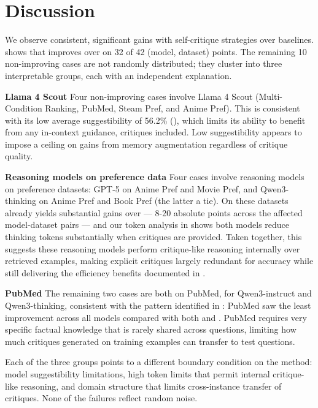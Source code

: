 \section{Discussion}

We observe consistent, significant gains  with self-critique strategies over baselines.
 shows that \EPSEMCRIT{} improves over \EPLABEL{} on 32 of 42 (model, dataset) points. The remaining 10 non-improving cases are not randomly distributed; they cluster into three interpretable groups, each with an independent explanation.

\textbf{Llama 4 Scout} Four non-improving cases involve Llama 4 Scout (Multi-Condition Ranking, PubMed, Steam Pref, and Anime Pref). This is consistent with its low average suggestibility of 56.2\% (), which limits its ability to benefit from any in-context guidance, critiques included. Low suggestibility appears to impose a ceiling on gains from memory augmentation regardless of critique quality.

\textbf{Reasoning models on preference data} Four cases involve reasoning models on preference datasets: GPT-5 on Anime Pref and Movie Pref, and Qwen3-thinking on Anime Pref and Book Pref (the latter a tie). On these datasets \EPLABEL{} already yields substantial gains over \ZEROSHOT{} --- 8-20 absolute points across the affected model-dataset pairs --- and our token analysis in  shows both models reduce thinking tokens substantially when critiques are provided. Taken together, this suggests these reasoning models perform critique-like reasoning internally over retrieved examples, making explicit critiques largely redundant for accuracy while still delivering the efficiency benefits documented in .

\textbf{PubMed} The remaining two cases are both on PubMed, for Qwen3-instruct and Qwen3-thinking, consistent with the pattern identified in : PubMed saw the least improvement across all models compared with both \ZEROSHOT{} and \EPLABEL{}. PubMed requires very specific factual knowledge that is rarely shared across questions, limiting how much critiques generated on training examples can transfer to test questions.

Each of the three groups points to a different boundary condition on the method: model suggestibility limitations, high token limits that permit internal critique-like reasoning, and domain structure that limits cross-instance transfer of critiques. None of the failures reflect random noise.

